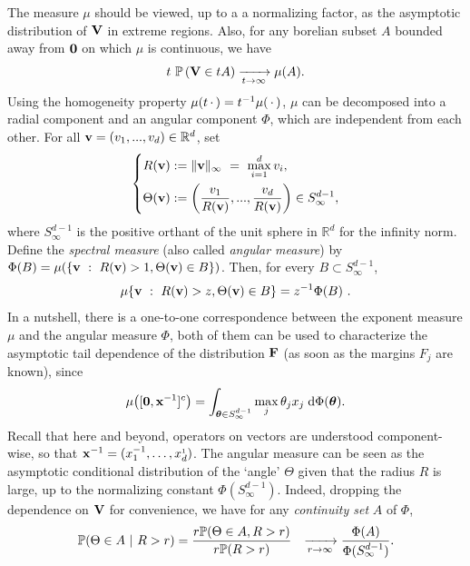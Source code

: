 The measure $\mu$ should be viewed, up to a a normalizing factor, as
the asymptotic distribution of $\mathbf V$ in extreme regions. Also, for any borelian subset $A$ bounded away from $\mathbf 0$ on which $\mu$ is continuous, we have 
\begin{align}
\label{jmva:eq:regularVariation}
t~ \mathbb{P}\left( \mathbf V \in t A\right) \xrightarrow[t\to\infty]{}\mu(A).     
\end{align}
Using the homogeneity property $\mu(t\,\cdot\,) =
t^{-1}\mu(\,\cdot\,)$, $\mu$  can be decomposed into a radial component and an angular component $\Phi$, which are independent from each other.
For all $\mathbf v = (v_1,...,v_d) \in \mathbb{R}^d$, set
\begin{align}\label{jmva:eq:pseudoPolar_change}
  \left\{ \begin{aligned}
R(\mathbf v)&:= \|\mathbf v\|_\infty ~=~ \max_{i=1}^d v_i, \\
\Theta (\mathbf v) &:= \left( \frac{v_1}{R(\mathbf v)},..., \frac{v_d}{R(\mathbf v)} \right)
\in S_\infty^{d-1},     
  \end{aligned}\right.
\end{align}
where $S_\infty^{d-1}$ is the positive orthant of  the unit sphere in $\mathbb{R}^d$ for the infinity norm.
Define the \emph{ spectral measure} (also called \emph{angular measure}) by $\Phi(B)= \mu (\{\mathbf v~:~R(\mathbf v)>1 ,
\Theta(\mathbf v) \in B \})$. Then, for every $B
\subset S_\infty^{d-1}$, 
\begin{align}
\label{jmva:mu-phi}
\mu\{\mathbf v~:~R(\mathbf v)>z, \Theta(\mathbf v) \in B \} = z^{-1} \Phi (B)~. 
\end{align}
In a nutshell,  there
is a one-to-one correspondence between the exponent measure $\mu$ and the angular measure
$\Phi$, both of them can be used to characterize the asymptotic tail
dependence of the distribution $\mathbf F$ (as
soon as the  margins $F_j$ are known), since   %
\begin{align}\label{jmva:eq:integratePhiLambda}
  \mu \big( [\mathbf 0,\mathbf{x}^{-1}]^c \big) =  \int_{\boldsymbol{\theta} \in S_{\infty}^{d-1}}   \max_j{\theta_j x_j} \;\mathrm{d} \Phi(\boldsymbol{\theta}).
\end{align}
Recall that here and beyond, operators on vectors are understood component-wise, so that $\mathbf x^{-1}=(x_1^{-1},\ldots,x_d^{_1})$.
The angular measure can be seen as the asymptotic conditional distribution of the
`angle' $\Theta$ given that the radius $R$ is large, up to the
normalizing constant $\Phi(S_\infty^{d-1})$. Indeed, dropping
the dependence on $\mathbf V$ for convenience, we have for any
\emph{continuity set} $A$ of $\Phi$, 
\begin{align}
  \label{jmva:eq:limitConditAngle}
\begin{aligned}
  \mathbb{P}(\Theta \in A ~|~R>r ) &= 
\frac{r  \mathbb{P}(\Theta \in A , R>r ) }{r\mathbb{P}(R>r)} 
& \xrightarrow[r\to \infty]{} \frac{\Phi(A)}{\Phi(S_\infty^{d-1})} .
\end{aligned}  
\end{align}


